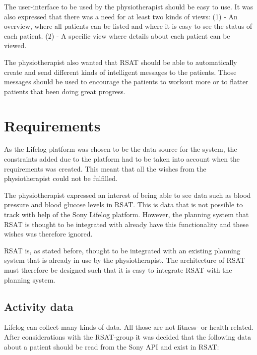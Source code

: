 \documentclass{cslthse-msc}
\begin{document}
The user-interface to be used by the physiotherapist should be easy to use. It was also expressed that there was a need for at least two kinds of views: (1) - An overview, where all patients can be listed and where it is easy to see the status of each patient. (2) - A specific view where details about each patient can be viewed.

The physiotherapist also wanted that RSAT should be able to automatically create and send different kinds of intelligent messages to the patients. Those messages should be used to encourage the patients to workout more or to flatter patients that been doing great progress. 

\section{Requirements}
\label{sec:req}
As the Lifelog platform was chosen to be the data source for the system, the constraints added due to the platform had to be taken into account when the requirements was created. This meant that all the wishes from the physiotherapist could not be fulfilled.


The physiotherapist expressed an interest of being able to see data such as blood pressure and blood glucose levels in RSAT. This is data that is not possible to track with help of the Sony Lifelog platform. However, the planning system that RSAT is thought to be integrated with already have this functionality and these wishes was therefore ignored. 

RSAT is, as stated before, thought to be integrated with an existing planning system that is already in use by the physiotherapist. The architecture of RSAT must therefore be designed such that it is easy to integrate RSAT with the planning system.

\subsection{Activity data}



Lifelog can collect many kinds of data. All those are not fitness- or health related. After considerations with the RSAT-group it was decided that the following data about a patient should be read from the Sony API and exist in RSAT:
\end{document}

